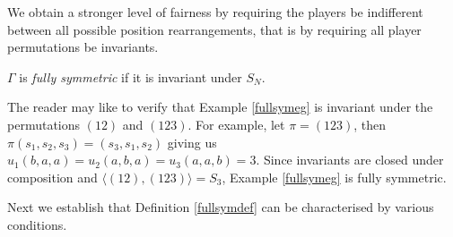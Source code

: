 	We obtain a stronger level of fairness by requiring the players be indifferent between all possible position rearrangements, that is by requiring all player permutations be invariants.

\begin{definition} \label{fullsymdef}
	$\Gamma$ is \textit{fully symmetric} if it is invariant under $S_N$.
\end{definition}

The reader may like to verify that Example \ref{fullsymeg} is invariant under the permutations $(12)$ and $(123)$. For example, let $\pi = (123)$, then $\pi(s_1, s_2, s_3) = (s_3, s_1, s_2)$ giving us $u_1(b, a, a) = u_2(a, b, a) = u_3(a, a, b) = 3$. Since invariants are closed under composition and $\langle (12), (123)\rangle = S_3$, Example \ref{fullsymeg} is fully symmetric. 

Next we establish that Definition \ref{fullsymdef} can be characterised by various conditions. 

